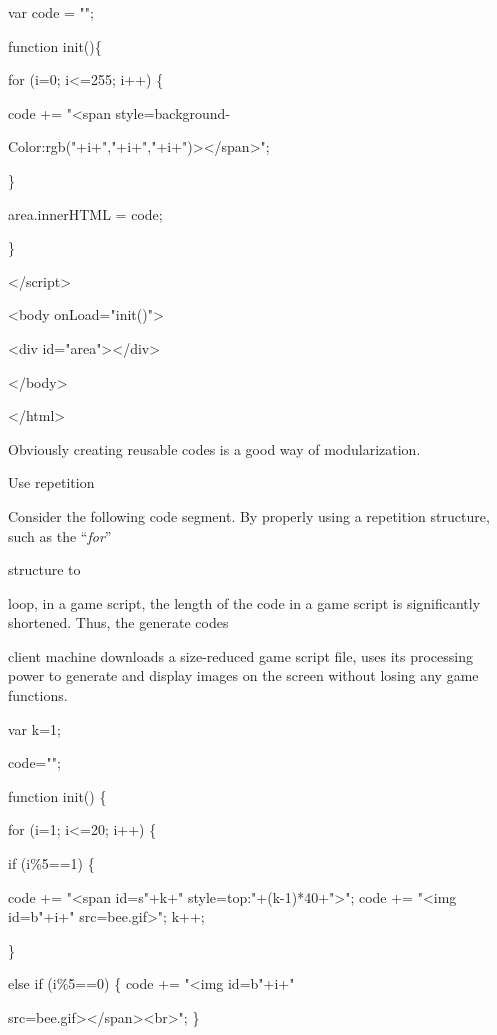 \documentclass[
]{article}
\begin{document}
var code = "";

function init()\{

for (i=0; i\textless=255; i++) \{

code += "\textless span style=\textquotesingle background-

Color:rgb("+i+","+i+","+i+")\textquotesingle\textgreater\textless/span\textgreater";

\}

area.innerHTML = code;

\}

\textless/script\textgreater{}

\textless body onLoad="init()"\textgreater{}

\textless div id="area"\textgreater\textless/div\textgreater{}

\textless/body\textgreater{}

\textless/html\textgreater{}

Obviously creating reusable codes is a good way of modularization.

Use repetition

Consider the following code segment. By properly using a repetition
structure, such as the ``\emph{for}''

structure to

loop, in a game script, the length of the code in a game script is
significantly shortened. Thus, the generate codes

client machine downloads a size-reduced game script file, uses its
processing power to generate and display images on the screen without
losing any game functions.

var k=1;

code="";

function init() \{

for (i=1; i\textless=20; i++) \{

if (i\%5==1) \{

code += "\textless span id=\textquotesingle s"+k+"\textquotesingle{}
style=\textquotesingle top:"+(k-1)*40+"\textquotesingle\textgreater";
code += "\textless img id=\textquotesingle b"+i+"\textquotesingle{}
src=\textquotesingle bee.gif\textquotesingle\textgreater"; k++;

\}

else if (i\%5==0) \{ code += "\textless img
id=\textquotesingle b"+i+"\textquotesingle{}

src=\textquotesingle bee.gif\textquotesingle\textgreater\textless/span\textgreater\textless br\textgreater";
\}
\end{document}
